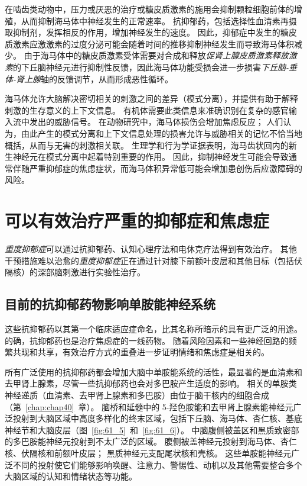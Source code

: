 在啮齿类动物中，压力或厌恶的治疗或糖皮质激素的施用会抑制颗粒细胞前体的增殖，从而抑制海马体中神经发生的正常速率。
抗抑郁药，包括选择性血清素再摄取抑制剂，发挥相反的作用，增加神经发生的速度。
因此，抑郁症中发生的糖皮质激素应激激素的过度分泌可能会随着时间的推移抑制神经发生而导致海马体积减少。
由于海马体中的糖皮质激素受体需要对合成和释放\textit{促肾上腺皮质激素释放激素}的下丘脑神经元进行抑制性反馈，因此海马体功能受损会进一步损害\textit{下丘脑-垂体-肾上腺}轴的反馈调节，从而形成恶性循环。


海马体允许大脑解决密切相关的刺激之间的差异（模式分离），并提供有助于解释刺激的生存意义的上下文信息。
有机体需要此类信息来准确识别在复杂的感官输入流中发出的威胁信号。
在动物研究中，海马体损伤会增加焦虑反应；
人们认为，由此产生的模式分离和上下文信息处理的损害允许与威胁相关的记忆不恰当地概括，从而与无害的刺激相关联。
生理学和行为学证据表明，海马齿状回内的新生神经元在模式分离中起着特别重要的作用。
因此，抑制神经发生可能会导致通常伴随严重抑郁症的焦虑症状，而海马体积异常低可能会增加患创伤后应激障碍的风险。



\section{可以有效治疗严重的抑郁症和焦虑症}

\textit{重度抑郁症}可以通过抗抑郁药、认知心理疗法和电休克疗法得到有效治疗。
其他干预措施难以治愈的\textit{重度抑郁症}正在通过针对膝下前额叶皮层和其他目标（包括伏隔核）的深部脑刺激进行实验性治疗。



\subsection{目前的抗抑郁药物影响单胺能神经系统}

这些抗抑郁药以其第一个临床适应症命名，比其名称所暗示的具有更广泛的用途。
的确，抗抑郁药也是治疗焦虑症的一线药物。
随着风险因素和一些神经回路的频繁共现和共享，有效治疗方式的重叠进一步证明情绪和焦虑症是相关的。


所有广泛使用的抗抑郁药都会增加大脑中单胺能系统的活性，最显著的是血清素和去甲肾上腺素，尽管一些抗抑郁药也会对多巴胺产生适度的影响。
相关的单胺类神经递质（血清素、去甲肾上腺素和多巴胺）由位于脑干核内的细胞合成（第~\ref{chap:chap40}~章）。
脑桥和延髓中的 5-羟色胺能和去甲肾上腺素能神经元广泛投射到大脑区域中高度多样化的终末区域，包括下丘脑、海马体、杏仁核、基底神经节和大脑皮层（图~\ref{fig:61_5}~和~\ref{fig:61_6}）。
中脑腹侧被盖区和黑质致密部的多巴胺能神经元投射到不太广泛的区域。
腹侧被盖神经元投射到海马体、杏仁核、伏隔核和前额叶皮层；
黑质神经元支配尾状核和壳核。
这些单胺能神经元广泛不同的投射使它们能够影响唤醒、注意力、警惕性、动机以及其他需要整合多个大脑区域的认知和情绪状态等功能。


